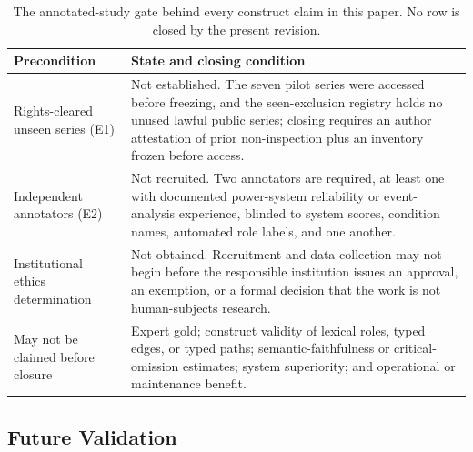 \documentclass[information,article,submit,moreauthors]{Definitions/mdpi}
\begin{document}
\begin{table}[H]
\caption{The annotated-study gate behind every construct claim in this paper. No row is closed by the present revision.}
\label{tab:e2-gate}\centering\small
\begin{tabular}{p{}p{}}
\toprule
Precondition & State and closing condition\\
\midrule
Rights-cleared unseen series (E1) & Not established. The seven pilot series were accessed before freezing, and the seen-exclusion registry holds no unused lawful public series; closing requires an author attestation of prior non-inspection plus an inventory frozen before access.\\
Independent annotators (E2) & Not recruited. Two annotators are required, at least one with documented power-system reliability or event-analysis experience, blinded to system scores, condition names, automated role labels, and one another.\\
Institutional ethics determination & Not obtained. Recruitment and data collection may not begin before the responsible institution issues an approval, an exemption, or a formal decision that the work is not human-subjects research.\\
\midrule
May not be claimed before closure & Expert gold; construct validity of lexical roles, typed edges, or typed paths; semantic-faithfulness or critical-omission estimates; system superiority; and operational or maintenance benefit.\\
\bottomrule
\end{tabular}
\end{table}

\subsection{Future Validation}
\label{sec:future-validation}
\end{document}
